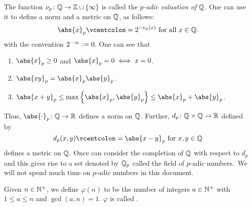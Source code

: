 \begin{rem}
    The function $\nu_p \colon \mathbb{Q} \to \mathbb{Z} \cup \{\infty\}$ is called the \emph{$p$-adic valuation of $\mathbb{Q}$}. One can use it to define a norm and a metric on $\mathbb{Q}$, as follows:
\[
    \abs{x}_p \vcentcolon= 2^{-\nu_p(x)} \text{ for all } x \in \Q.
\]
with the convention $2^{-\infty} \vcentcolon= 0$. One can see that
\begin{enumerate}
    \item $\abs{x}_p \geq 0$ and $\abs{x}_p = 0 \iff x =0$.
    \item $\abs{xy}_p = \abs{x}_p \abs{y}_p$.
    \item $\abs{x+y}_p \leq \max\left\{ \abs{x}_p, \abs{y}_p \right\} \leq \abs{x}_p + \abs{y}_p$.
\end{enumerate}
Thus, $\abs{\cdot}_p \colon \Q \to \R$ defines a norm on $\mathbb{Q}$. Further, $d_p \colon \mathbb{Q} \times \mathbb{Q} \to \mathbb{R}$ defined by
\[
    d_p(x,y) \vcentcolon= \abs{x-y}_p \text{ for } x,y \in \Q
\]
defines a metric on $\mathbb{Q}$. Once can consider the completion of $\mathbb{Q}$ with respect to $d_p$ and this gives rise to a set denoted by $\mathbb{Q}_p$ called the field of $p$-adic numbers.\footnotemark\ We will not spend much time on $p$-adic numbers in this document.
\end{rem}

\begin{defn}
    Given $n \in \mathbb{N}^+$, we define $\varphi(n)$ to be the number of integers $a \in \mathbb{N}^+$ with $1 \leq a \leq n$ and $\gcd(a,n) = 1$. $\varphi$ is called .
\end{defn}

